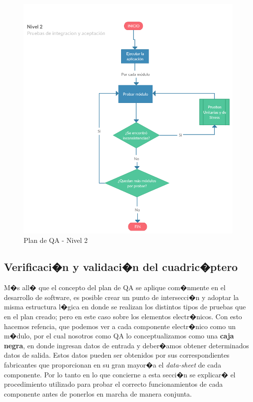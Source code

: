 \begin{itemize}
	
	\begin{figure}[h!]
		\centering
		\includegraphics[width=0.7\linewidth, height=0.3\textheight]{Imagenes/Nivel2}
		\caption{Plan de QA - Nivel 2}
		\label{fig:nivel2}
	\end{figure}
	
	
	
\end{itemize}



\subsection{Verificaci�n y validaci�n del cuadric�ptero}

M�s all� que el concepto del plan de QA se aplique com�nmente en el desarrollo de software, es posible crear un punto de intersecci�n y adoptar la misma estructura l�gica en donde se realizan los distintos tipos de pruebas que en el plan creado; pero en este caso sobre los elementos electr�nicos. Con esto hacemos refencia, que podemos ver a cada componente electr�nico como un m�dulo, por el cual nosotros como QA lo conceptualizamos como una \textbf{caja negra}, en donde ingresan  datos de entrada y deber�amos obtener determinados datos de salida. Estos datos  pueden ser obtenidos por sus correspondientes fabricantes que proporcionan en su gran mayor�a el \textit{data-sheet} de cada componente. 
Por lo tanto en lo que concierne a esta secci�n se explicar� el procedimiento utilizado para probar el correcto funcionamientos de cada componente antes de ponerlos en marcha de manera conjunta. 


